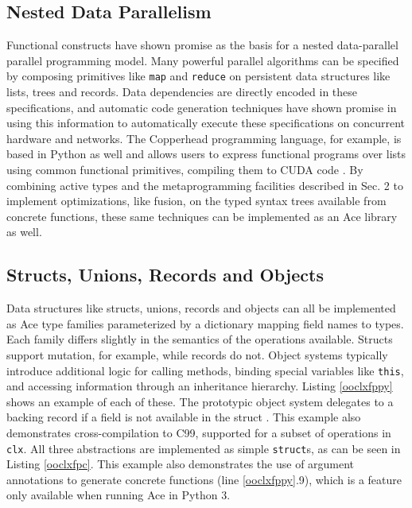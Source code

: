 \documentclass[9pt,preprint]{sigplanconf}
\begin{document}
\subsection{Nested Data Parallelism}
Functional constructs have shown promise as the basis for a nested data-parallel parallel programming model. Many powerful parallel algorithms can be specified by composing primitives like \verb|map| and \verb|reduce| on persistent data structures like lists, trees and records. Data dependencies are directly encoded in these specifications, and automatic code generation techniques have shown promise in using this information to automatically execute these specifications on concurrent hardware and networks. The Copperhead programming language, for example, is based in Python as well and allows users to express functional programs over lists using common functional primitives, compiling them to CUDA code \cite{catanzaro2011copperhead}. By combining active types and the metaprogramming facilities described in Sec. 2 to implement optimizations, like fusion, on the typed syntax trees available from concrete functions, these same techniques can be implemented as an Ace library as well.

\subsection{Structs, Unions, Records and Objects}
Data structures like structs, unions, records and objects can all be implemented as Ace type families  parameterized by a dictionary mapping field names to types. Each family differs slightly in the semantics of the operations available. Structs support mutation, for example, while records do not. Object systems typically introduce additional logic for calling methods, binding special variables like \verb|this|, and accessing information through an inheritance hierarchy. Listing \ref{ooclxfppy} shows an example of each of these. The prototypic object system delegates to a backing record if a field is not available in the struct \cite{self}. This example also demonstrates cross-compilation to C99, supported for a subset of operations in \verb|clx|. All three abstractions are implemented as simple \verb|struct|s, as can be seen in Listing \ref{ooclxfpc}. This example also demonstrates the use of argument annotations to generate concrete functions (line \ref{ooclxfppy}.9), which is a feature only available when running Ace in Python 3. 
\end{document}
